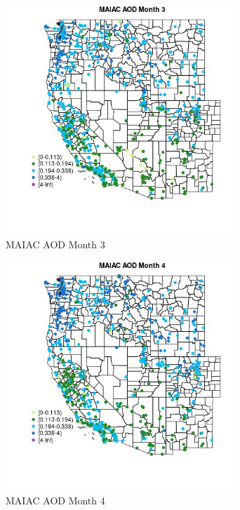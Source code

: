 \begin{figure} 
\centering  
\includegraphics[width=0.77\textwidth]{Code_Outputs/Report_ML_input_PM25_Step4_part_f_de_duplicated_aveswNAs_MapObsMo3MAIAC_AOD.jpg} 
\caption{\label{fig:Report_ML_input_PM25_Step4_part_f_de_duplicated_aveswNAsMapObsMo3MAIAC_AOD}MAIAC AOD Month 3} 
\end{figure} 
 

\begin{figure} 
\centering  
\includegraphics[width=0.77\textwidth]{Code_Outputs/Report_ML_input_PM25_Step4_part_f_de_duplicated_aveswNAs_MapObsMo4MAIAC_AOD.jpg} 
\caption{\label{fig:Report_ML_input_PM25_Step4_part_f_de_duplicated_aveswNAsMapObsMo4MAIAC_AOD}MAIAC AOD Month 4} 
\end{figure} 
 

